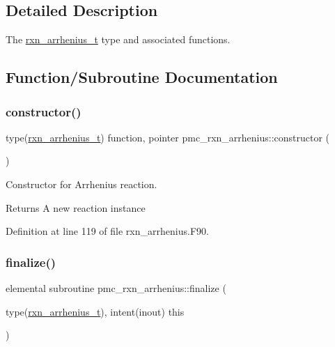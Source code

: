 \subsection{Detailed Description}
The \mbox{\hyperlink{structpmc__rxn__arrhenius_1_1rxn__arrhenius__t}{rxn\+\_\+arrhenius\+\_\+t}} type and associated functions. 

\subsection{Function/\+Subroutine Documentation}
\mbox{\label{namespacepmc__rxn__arrhenius_a01eb485a07b0ebe221eafbd3895e7bb9}} 
\subsubsection{\texorpdfstring{constructor()}{constructor()}}
{\footnotesize\ttfamily type(\mbox{\hyperlink{structpmc__rxn__arrhenius_1_1rxn__arrhenius__t}{rxn\+\_\+arrhenius\+\_\+t}}) function, pointer pmc\+\_\+rxn\+\_\+arrhenius\+::constructor (\begin{DoxyParamCaption}{ }\end{DoxyParamCaption})\hspace{0.3cm}{\ttfamily [private]}}



Constructor for Arrhenius reaction. 

\begin{DoxyReturn}{Returns}
A new reaction instance 
\end{DoxyReturn}


Definition at line 119 of file rxn\+\_\+arrhenius.\+F90.

\mbox{\label{namespacepmc__rxn__arrhenius_a88b969b655e039c6d75e80ff1a3cf77f}} 
\subsubsection{\texorpdfstring{finalize()}{finalize()}}
{\footnotesize\ttfamily elemental subroutine pmc\+\_\+rxn\+\_\+arrhenius\+::finalize (\begin{DoxyParamCaption}\item[{type(\mbox{\hyperlink{structpmc__rxn__arrhenius_1_1rxn__arrhenius__t}{rxn\+\_\+arrhenius\+\_\+t}}), intent(inout)}]{this }\end{DoxyParamCaption})\hspace{0.3cm}{\ttfamily [private]}}



